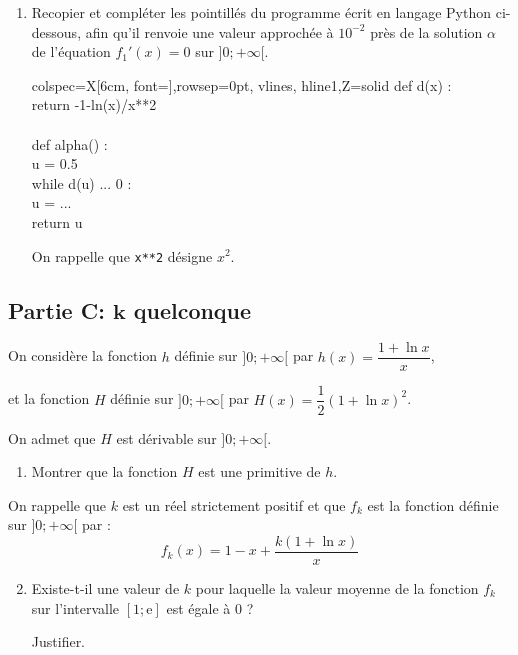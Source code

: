 \documentclass[10pt]{article}
\providecommand{\e}{{\mathrm{e}}}
\begin{document}
\begin{enumerate}
\begin{enumerate}
				En déduire que $f_{1}$ admet un maximum sur l'intervalle $] 0 ;+\infty[$.

				\item Recopier et compléter les pointillés du programme écrit en langage Python ci-dessous, afin qu'il renvoie une valeur approchée à $10^{-2}$ près de la solution $\alpha$ de l'équation \quad $f_{1}'(x)=0$ \quad sur $] 0 ;+\infty[$.

				\begin{center}
				\begin{tblr}{colspec={X[6cm, font=\ttfamily]},rowsep=0pt, vlines, hline{1,Z}={solid}}
					def d(x) :\\
					\quad return -1-ln(x)/x**2\\
					\\
					def alpha() :\\
					\quad u = 0.5\\
					\quad while d(u) ... 0 :\\
					\quad \quad u = ...\\
					\quad return u\\
				\end{tblr}
				\end{center}

				On rappelle que \texttt{x**2} désigne $x^{2}$.
			\end{enumerate}

			\end{enumerate}

	\subsection*{Partie C: $\boldsymbol{k}$ quelconque}
		On considère la fonction $h$ définie sur $] 0 ;+\infty[$ par \quad
		$h(x)=\dfrac{1+\ln x}{x}$,

		et la fonction $H$ définie sur $] 0 ;+\infty[$ par \quad
		$H(x)=\dfrac{1}{2}(1+\ln x)^{2}$.

		On admet que $H$ est dérivable sur $] 0 ;+\infty[$.

		\begin{enumerate}
			\item Montrer que la fonction $H$ est une primitive de $h$.
		\end{enumerate}

		On rappelle que $k$ est un réel strictement positif et que $f_{k}$ est la fonction définie sur $] 0 ;+\infty[$ par :
		\[f_{k}(x)=1-x+\dfrac{k(1+\ln x)}{x}\]

		\begin{enumerate}
			\setcounter{enumi}{1}
			\item Existe-t-il une valeur de $k$ pour laquelle la valeur moyenne de la fonction $f_{k}$ sur l'intervalle $[ 1 ; \e]$ est égale à 0 ?

			Justifier.
		\end{enumerate}
\end{document}

